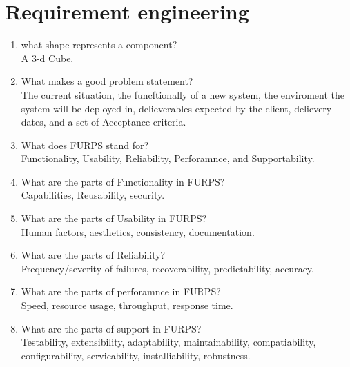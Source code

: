 \documentclass[10pt]{article}
\begin{document}
\section{Requirement engineering}
\begin{enumerate}

      \item what shape represents a component?\\
            A 3-d Cube.\\

      \item What makes a good problem statement?\\
            The current situation, the funcftionally of a new system, the enviroment the system will be deployed in, delieverables expected by the client, delievery dates, and a set of Acceptance criteria.\\

      \item What does FURPS stand for?\\
            Functionality, Usability, Reliability, Perforamnce, and Supportability.\\

      \item What are the parts of Functionality in FURPS?\\
            Capabilities, Reusability, security.\\

      \item What are the parts of Usability in FURPS?\\
            Human factors, aesthetics, consistency, documentation.

      \item What are the parts of Reliability?\\
            Frequency/severity of failures, recoverability, predictability, accuracy.\\

      \item What are the parts of perforamnce in FURPS?\\
            Speed, resource usage, throughput, response time.\\

      \item What are the parts of support in FURPS?\\
            Testability, extensibility, adaptability, maintainability, compatiability, configurability, servicability, installiability, robustness.\\


\end{enumerate}
\end{document}
